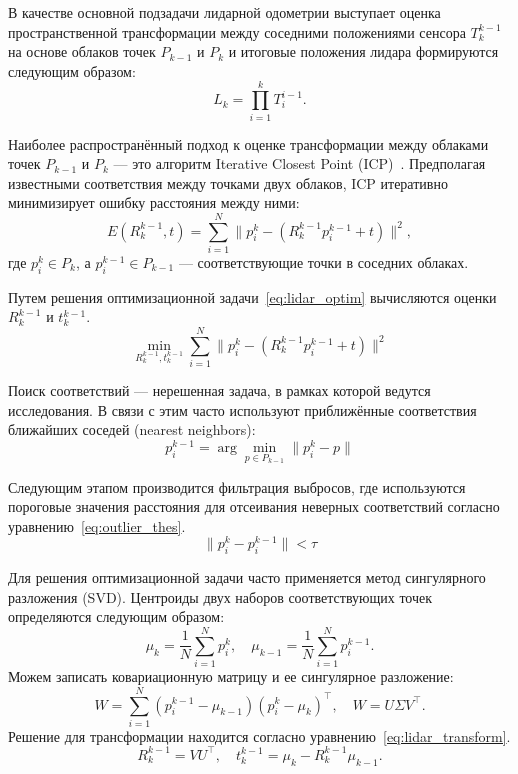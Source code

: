 В качестве основной подзадачи лидарной одометрии выступает оценка пространственной 
трансформации между соседними положениями сенсора $T_k^{k-1}$ на основе облаков 
точек ${P}_{k-1}$ и ${P}_k$ и итоговые положения лидара формируются
следующим образом:
\begin{equation*}
    L_k = \prod_{i=1}^{k} T_i^{i-1}.
\end{equation*}

Наиболее распространённый подход к оценке трансформации между облаками точек 
${P}_{k-1}$ и ${P}_k$ --- это алгоритм Iterative Closest Point (ICP)~\cite{4767965}.
Предполагая известными соответствия между точками двух облаков, 
ICP итеративно минимизирует ошибку расстояния между ними:
\begin{equation*}
    E(R^{k-1}_k ,t) = \sum_{i=1}^{N}\|p_i^k - (R^{k-1}_k p_i^{k-1}+t)\|^2,
\end{equation*}
где $p_i^k \in {P}_k$, а $p_i^{k-1} \in {P}_{k-1}$ --- соответствующие точки в соседних облаках.

Путем решения оптимизационной задачи~\eqref{eq:lidar_optim} вычисляются оценки $R^{k-1}_k$ и $t^{k-1}_k$.
\begin{equation}
    \label{eq:lidar_optim}
    \min_{R^{k-1}_k ,t^{k-1}_k}\sum_{i=1}^{N}\|p_i^k - (R^{k-1}_k p_i^{k-1}+t)\|^2
\end{equation}

Поиск соответствий --- нерешенная задача, в рамках которой ведутся исследования. 
В связи с этим часто используют приближённые соответствия ближайших соседей (nearest neighbors):
\begin{equation*}
    p_i^{k-1} = \arg\min_{p \in {P}_{k-1}} \|p_i^k - p\|
\end{equation*}

Следующим этапом производится фильтрация выбросов, где используются пороговые 
значения расстояния для отсеивания неверных соответствий согласно уравнению~\eqref{eq:outlier_thes}.
\begin{equation}
    \label{eq:outlier_thes}
    \|p_i^k - p_i^{k-1}\| < \tau
\end{equation}

Для решения оптимизационной задачи часто применяется метод сингулярного разложения (SVD). 
Центроиды двух наборов соответствующих точек определяются следующим образом:
\begin{equation*}
    \mu_k = \frac{1}{N}\sum_{i=1}^{N}p_i^k, \quad \mu_{k-1} = \frac{1}{N}\sum_{i=1}^{N}p_i^{k-1}.
\end{equation*}
Можем записать ковариационную матрицу и ее сингулярное разложение:
\begin{equation*}
    W = \sum_{i=1}^{N}(p_i^{k-1}-\mu_{k-1})(p_i^k-\mu_k)^\top, \quad W = U\Sigma V^\top.
\end{equation*}
Решение для трансформации находится согласно уравнению~\eqref{eq:lidar_transform}.
\begin{equation}
    \label{eq:lidar_transform}
    R^{k-1}_k = VU^\top, \quad t^{k-1}_k = \mu_k - R^{k-1}_k\mu_{k-1}.
\end{equation}

